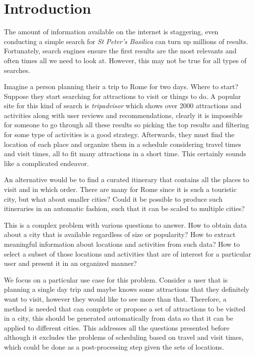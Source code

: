 \chapter{Introduction}
\label{sec:introduction}

The amount of information available on the internet is staggering, even conducting a simple search for \textit{St Peter's Basilica} can turn up millions of results. Fortunately, search engines ensure the first results are the most relevants and often times all we need to look at. However, this may not be true for all types of searches.

Imagine a person planning their a trip to Rome for two days. Where to start? Suppose they start searching for attractions to visit or things to do. A popular site for this kind of search is \textit{tripadvisor} which shows over 2000 attractions and activities along with user reviews and recommendations, clearly it is impossible for someone to go through all these results so picking the top results and filtering for some type of activities is a good strategy. Afterwards, they must find the location of each place and organize them in a schedule considering travel times and visit times, all to fit many attractions in a short time. This certainly sounds like a complicated endeavor.

An alternative would be to find a curated itinerary that contains all the places to visit and in which order. There are many for Rome since it is such a touristic city, but what about smaller cities? Could it be possible to produce such itineraries in an automatic fashion, such that it can be scaled to multiple cities?

This is a complex problem with various questions to answer. How to obtain data about a city that is available regardless of size or popularity? How to extract meaningful information about locations and activities from such data? How to select a subset of those locations and activities that are of interest for a particular user and present it in an organized manner?

We focus on a particular use case for this problem. Consider a user that is planning a single day trip and maybe knows some attractions that they definitely want to visit, however they would like to see more than that. Therefore, a method is needed that can complete or propose a set of attractions to be visited in a city, this should be generated automatically from data so that it can be applied to different cities. This addresses all the questions presented before although it excludes the problems of scheduling based on travel and visit times, which could be done as a post-processing step given the sets of locations.

